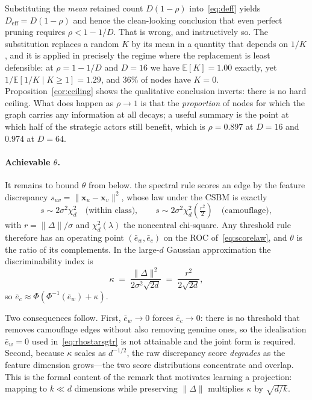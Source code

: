 \documentclass[../elsevier.tex]{subfiles}
\begin{document}
\begin{remark}
\label{rem:no-ceiling}
Substituting the \emph{mean} retained count $D(1-\rho)$
into~\eqref{eq:deff} yields $D_{\mathrm{eff}} = D(1-\rho)$ and hence the clean-looking
conclusion that even perfect pruning requires $\rho < 1-1/D$. That is wrong, and
instructively so. The substitution replaces a random $K$ by its mean in a quantity
that depends on $1/K$, and it is applied in precisely the regime where the
replacement is least defensible: at $\rho = 1-1/D$ and $D=16$ we have
$\mathbb{E}[K] = 1.00$ exactly, yet $1/\mathbb{E}[1/K \mid K\geq1] = 1.29$, and $36\%$ of
nodes have $K=0$. Proposition~\ref{cor:ceiling} shows the qualitative conclusion
inverts: there is no hard ceiling. What does happen as $\rho \to 1$ is that the
\emph{proportion} of nodes for which the graph carries any information at all decays;
a useful summary is the point at which half of the strategic actors still benefit,
which is $\rho = 0.897$ at $D=16$ and $0.974$ at $D=64$.
\end{remark}

\paragraph{Achievable $\theta$.}
It remains to bound $\theta$ from below. the spectral rule scores an edge by the feature
discrepancy $s_{uv} = \|\mathbf{x}_u - \mathbf{x}_v\|^2$, whose law under the CSBM
is exactly
\begin{equation}
    s \sim 2\sigma^2\chi^2_{d}
    \quad\text{(within class)},
    \qquad
    s \sim 2\sigma^2\chi^2_{d}\!\left(\tfrac{r^2}{2}\right)
    \quad\text{(camouflage)},
    \label{eq:scorelaw}
\end{equation}
with $r = \|\Delta\|/\sigma$ and $\chi^2_d(\lambda)$ the noncentral chi-square. Any
threshold rule therefore has an operating point $(\bar e_w, \bar e_c)$ on the ROC
of~\eqref{eq:scorelaw}, and $\theta$ is the ratio of its complements. In the
large-$d$ Gaussian approximation the discriminability index is
\begin{equation}
    \kappa \;=\; \frac{\|\Delta\|^2}{2\sigma^2\sqrt{2d}}
            \;=\; \frac{r^2}{2\sqrt{2d}} ,
    \label{eq:kappa}
\end{equation}
so $\bar e_c \approx \Phi(\Phi^{-1}(\bar e_w) + \kappa)$.

Two consequences follow. First, $\bar e_w \to 0$ forces $\bar e_c \to 0$: there is no
threshold that removes camouflage edges without also removing genuine ones, so the
idealisation $\bar e_w = 0$ used in~\eqref{eq:rhostarsgtr} is not attainable and the
joint form is required. Second, because $\kappa$ scales as $d^{-1/2}$, the raw
discrepancy score \emph{degrades} as the feature dimension grows---the two score
distributions concentrate and overlap. This is the formal content of the remark that
motivates learning a projection: mapping to $k \ll d$ dimensions while preserving
$\|\Delta\|$ multiplies $\kappa$ by $\sqrt{d/k}$.
\end{document}
